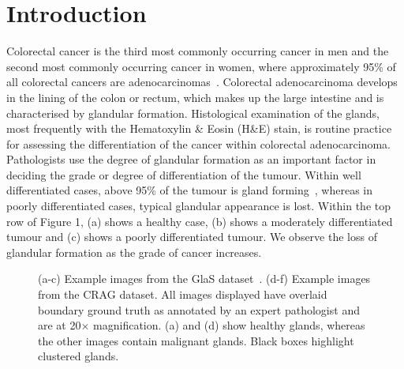 \documentclass[3p]{elsarticle}
\begin{document}
\section{Introduction}
Colorectal cancer is the third most commonly occurring cancer in men and the second most commonly occurring cancer in women, where approximately 95\% of all colorectal cancers are adenocarcinomas~\citep{fleming2012colorectal}. Colorectal adenocarcinoma develops in the lining of the colon or rectum, which makes up the large intestine and is characterised by glandular formation. Histological examination of the glands, most frequently with the Hematoxylin \& Eosin (H\&E) stain, is routine practice for assessing the differentiation of the cancer within colorectal adenocarcinoma. Pathologists use the degree of glandular formation as an important factor in deciding the grade or degree of differentiation of the tumour. Within well differentiated cases, above 95\% of the tumour is gland forming~\citep{fleming2012colorectal}, whereas in poorly differentiated cases, typical glandular appearance is lost. Within the top row of Figure 1, (a) shows a healthy case, (b) shows a moderately differentiated tumour and (c) shows a poorly differentiated tumour. We observe the loss of glandular formation as the grade of cancer increases. 


\begin{figure}[!t]
\captionsetup[subfigure]{labelformat=empty}
\centering
{}
\caption{(a-c) Example images from the GlaS dataset~\citep{sirinukunwattana2017gland}. (d-f) Example images from the CRAG dataset. All images displayed have overlaid boundary ground truth as annotated by an expert pathologist and are at 20$\times$ magnification. (a) and (d) show healthy glands, whereas the other images contain malignant glands. Black boxes highlight clustered glands.
}
\label{fig:detection}
\end{figure}
\end{document}
